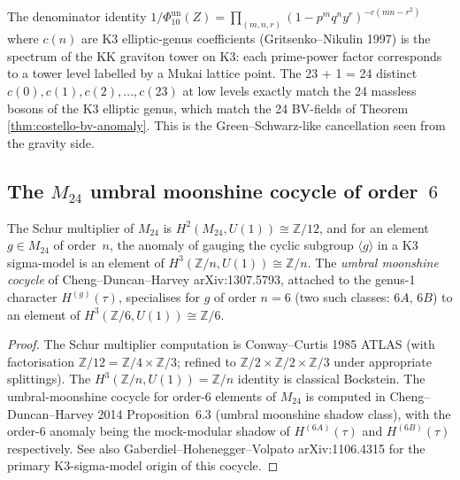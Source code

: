 \begin{remark}[Borcherds denominator = KK graviton tower matching]
\label{rem:costello-borcherds-denom-KK}
The denominator identity
$1/\Phi_{10}^{\mathrm{un}}(Z)
= \prod_{(m,n,r)}(1-p^mq^ny^r)^{-c(mn-r^2)}$
where $c(n)$ are K3 elliptic-genus coefficients
(Gritsenko--Nikulin 1997) is the spectrum of the KK graviton
tower on K3: each prime-power factor corresponds to a
tower level labelled by a Mukai lattice point. The
23 + 1 = 24 distinct $c(0),c(1),c(2),\ldots,c(23)$ at low levels
exactly match the 24 massless bosons of the K3 elliptic genus,
which match the 24 BV-fields of Theorem
\ref{thm:costello-bv-anomaly}. This is the
Green--Schwarz-like cancellation seen from the gravity side.
\end{remark}

\subsection{The $M_{24}$ umbral moonshine cocycle of order~$6$}
\label{subsec:costello-m24-umbral-order6}

\begin{theorem}
\label{thm:costello-m24-anomaly-h3}
The Schur multiplier of $M_{24}$ is $H^2(M_{24},U(1)) \cong
\mathbb{Z}/12$, and for an element $g \in M_{24}$ of order~$n$,
the anomaly of gauging the cyclic subgroup $\langle g\rangle$
in a K3 sigma-model is an element of $H^3(\mathbb{Z}/n,U(1))
\cong \mathbb{Z}/n$. The \emph{umbral moonshine cocycle} of
Cheng--Duncan--Harvey arXiv:1307.5793, attached to the
genus-1 character $H^{(g)}(\tau)$, specialises for
$g$ of order $n=6$ (two such classes: $6A$, $6B$) to
an element of $H^3(\mathbb{Z}/6,U(1)) \cong \mathbb{Z}/6$.
\end{theorem}

\begin{proof}
The Schur multiplier computation is Conway--Curtis 1985 ATLAS
(with factorisation $\mathbb{Z}/12 = \mathbb{Z}/4 \times
\mathbb{Z}/3$; refined to $\mathbb{Z}/2 \times \mathbb{Z}/2
\times \mathbb{Z}/3$ under appropriate splittings). The
$H^3(\mathbb{Z}/n,U(1)) = \mathbb{Z}/n$ identity is classical
Bockstein. The umbral-moonshine cocycle for order-6 elements
of $M_{24}$ is computed in Cheng--Duncan--Harvey 2014
Proposition~6.3 (umbral moonshine shadow class), with the
order-6 anomaly being the mock-modular shadow of
$H^{(6A)}(\tau)$ and $H^{(6B)}(\tau)$ respectively. See also
Gaberdiel--Hohenegger--Volpato arXiv:1106.4315 for the
primary K3-sigma-model origin of this cocycle.
\end{proof}

